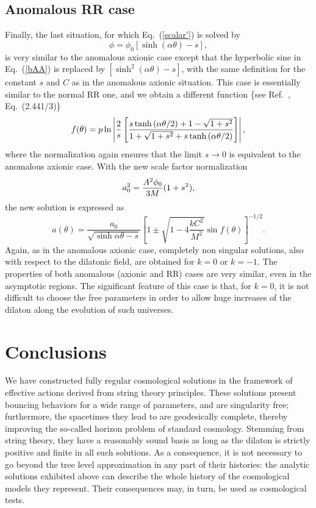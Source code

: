 \documentclass[a4paper,aps,twocolumn,prd,showpacs,nofootinbib]{revtex4}
\begin{document}
\subsection{Anomalous RR case}

Finally, the last situation, for which Eq.~(\ref{scalar'}) is solved
by
\begin{equation}
\phi =\phi_0 \left[\sinh\left(\alpha\theta\right)-s\right],
\end{equation}
is very similar to the anomalous axionic case except that the
hyperbolic sine in Eq.~(\ref{bAA}) is replaced by $[\sinh^2
(\alpha\theta) -s]$, with the same definition for the constant $s$ and
$C$ as in the anomalous axionic situation. This case is essentially
similar to the normal RR one, and we obtain a different function \{see
Ref.~\cite{Grad}, Eq.~(2.441/3)\}
\begin{equation}
f(\theta) = p\ln\left| {2\over s}
\left[\frac{s\tanh\left(\alpha\theta/2\right) + 1 - \sqrt{1 + s^2}}{1
+ \sqrt{1 + s^2}+ s\tanh\left(\alpha\theta/2\right)}\right]\right|,
\end{equation}
where the normalization again ensures that the limit $s\to 0$ is
equivalent to the anomalous axionic case. With the new scale factor
normalization
\begin{equation}
a_0^2 = {A^2 \phi_0\over 3M}(1+s^2),
\end{equation}
the new solution is expressed as
\begin{equation}
a(\theta) = \frac{a_0}{\sqrt{\sinh\alpha\theta - s}}\left[1 \pm
\sqrt{1 - 4\displaystyle{\frac{kC^2}{M^2}}}\sin
f(\theta)\right]^{-1/2} \!\!\!\!\!\!\!\!\!\!.
\end{equation}
Again, as in the anomalous axionic case, completely non singular
solutions, also with respect to the dilatonic field, are obtained for
$k = 0$ or $k= - 1$. The properties of both anomalous (axionic and RR)
cases are very similar, even in the asymptotic regions.  The
significant feature of this case is that, for $k=0$, it is not
difficult to choose the free parameters in order to allow huge
increases of the dilaton along the evolution of such universes.

\section{Conclusions}

We have constructed fully regular cosmological solutions in the
framework of effective actions derived from string theory
principles. These solutions present bouncing behaviors for a wide
range of parameters, and are singularity free; furthermore, the
spacetimes they lead to are geodesically complete, thereby improving
the so-called horizon problem of standard cosmology. Stemming from
string theory, they have a reasonably sound basis as long as the
dilaton is strictly positive and finite in all such solutions. As a
consequence, it is not necessary to go beyond the tree level
approximation in any part of their histories: the analytic solutions
exhibited above can describe the whole history of the cosmological
models they represent.  Their consequences may, in turn, be used as
cosmological tests.
\end{document}
